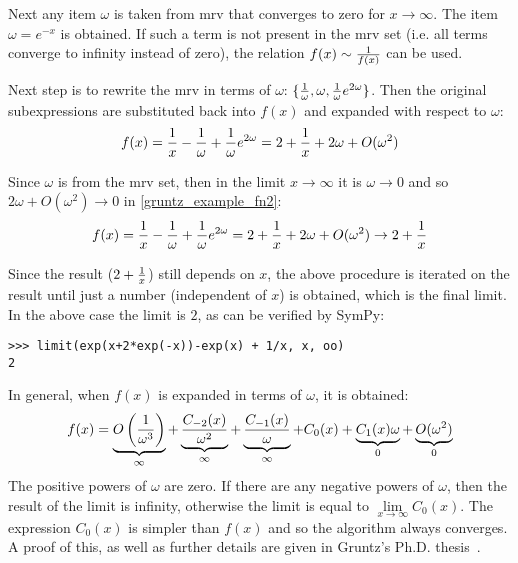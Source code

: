 Next any item $\omega$ is taken from mrv that converges to zero for
$x\to\infty$. The item $\omega=e^{-x}$ is obtained. If such a term is not
present in the mrv set (i.e. all terms converge to infinity instead of zero),
the relation $f(x)\sim {1\over f(x)}$ can be used.

Next step is to rewrite the mrv in terms of $\omega$: $\{{1\over\omega},
\omega, {1\over\omega}e^{2\omega}\}$. Then the original subexpressions are
substituted back into $f(x)$ and expanded with respect to $\omega$:
\begin{equation}
    \label{gruntz_example_fn2}
f(x) = {1\over x}-{1\over\omega}+{1\over\omega}e^{2\omega}
     = 2+{1\over x} + 2\omega + O(\omega^2)
\end{equation}

Since $\omega$ is from the mrv set, then in the limit $x\to\infty$ it is
$\omega\to0$ and so $2\omega + O(\omega^2) \to 0$ in
\eqref{gruntz_example_fn2}:
\begin{equation}
f(x) = {1\over x}-{1\over\omega}+{1\over\omega}e^{2\omega}
    = 2+{1\over x} + 2\omega + O(\omega^2)
    \to 2 + {1\over x}
\end{equation}

Since the result ($2+{1\over x}$) still depends on $x$, the above procedure is
iterated on the result until just a number (independent of $x$) is obtained,
which is the final limit. In the above case the limit is $2$, as can be
verified by SymPy:

\begin{verbatim}
>>> limit(exp(x+2*exp(-x))-exp(x) + 1/x, x, oo)
2
\end{verbatim}

In general, when $f(x)$ is expanded in terms of $\omega$, it is obtained:
\begin{equation}
f(x) = \underbrace{O\left({1\over \omega^3}\right)}_\infty
    + \underbrace{C_{-2}(x)\over \omega^2}_\infty
    + \underbrace{C_{-1}(x)\over \omega}_\infty
    + {C_{0}(x)}
    + \underbrace{C_{1}(x)\omega}_0
    + \underbrace{O(\omega^2)}_0
\end{equation}
The positive powers of $\omega$ are zero. If there are any negative powers of
$\omega$, then the result of the limit is infinity, otherwise the limit is
equal to $\lim\limits_{x\to\infty} C_0(x)$. The expression $C_0(x)$ is simpler
than $f(x)$ and so the algorithm always converges. A proof of this, as well as
further details are given in Gruntz's Ph.D. thesis~\cite{Gruntz1996limits}.
